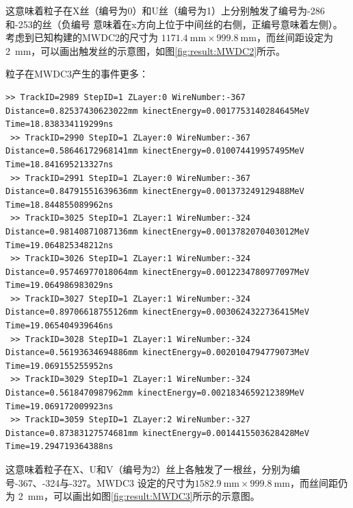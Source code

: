 \documentclass[bachelor,openany,oneside,color]{buaathesis}
\begin{document}
这意味着粒子在X丝（编号为0）和U丝（编号为1）上分别触发了编号为-286和-253的丝（负编号
意味着在x方向上位于中间丝的右侧，正编号意味着左侧）。考虑到已知构建的MWDC2的尺寸为
$\SI{1171.4}{\milli\meter}\times\SI{999.8}{\milli\meter}$，而丝间距设定为
\SI{2}{\milli\meter}，可以画出触发丝的示意图，如图\ref{fig:result:MWDC2}所示。


粒子在MWDC3产生的事件更多：

\begin{lstlisting}[firstnumber=4052,lastline=4060]
 >> TrackID=2989 StepID=1 ZLayer:0 WireNumber:-367 Distance=0.82537430623022mm kinectEnergy=0.0017753140284645MeV Time=18.838334119299ns
 >> TrackID=2990 StepID=1 ZLayer:0 WireNumber:-367 Distance=0.58646172968141mm kinectEnergy=0.010074419957495MeV Time=18.841695213327ns
 >> TrackID=2991 StepID=1 ZLayer:0 WireNumber:-367 Distance=0.84791551639636mm kinectEnergy=0.001373249129488MeV Time=18.844855089962ns
 >> TrackID=3025 StepID=1 ZLayer:1 WireNumber:-324 Distance=0.98140871087136mm kinectEnergy=0.0013782070403012MeV Time=19.064825348212ns
 >> TrackID=3026 StepID=1 ZLayer:1 WireNumber:-324 Distance=0.95746977018064mm kinectEnergy=0.0012234780977097MeV Time=19.064986983029ns
 >> TrackID=3027 StepID=1 ZLayer:1 WireNumber:-324 Distance=0.89706618755126mm kinectEnergy=0.0030624322736415MeV Time=19.065404939646ns
 >> TrackID=3028 StepID=1 ZLayer:1 WireNumber:-324 Distance=0.56193634694886mm kinectEnergy=0.0020104794779073MeV Time=19.069155255952ns
 >> TrackID=3029 StepID=1 ZLayer:1 WireNumber:-324 Distance=0.5618470987962mm kinectEnergy=0.0021834659212389MeV Time=19.069172009923ns
 >> TrackID=3059 StepID=1 ZLayer:2 WireNumber:-327 Distance=0.87383127574681mm kinectEnergy=0.0014415503628428MeV Time=19.294719364388ns
\end{lstlisting}

这意味着粒子在X、U和V（编号为2）丝上各触发了一根丝，分别为编号-367、-324与-327。MWDC3
设定的尺寸为$\SI{1582.9}{\milli\meter}\times\SI{999.8}{\milli\meter}$，而丝间距仍为
\SI{2}{\milli\meter}，可以画出如图\ref{fig:result:MWDC3}所示的示意图。

\end{document}
